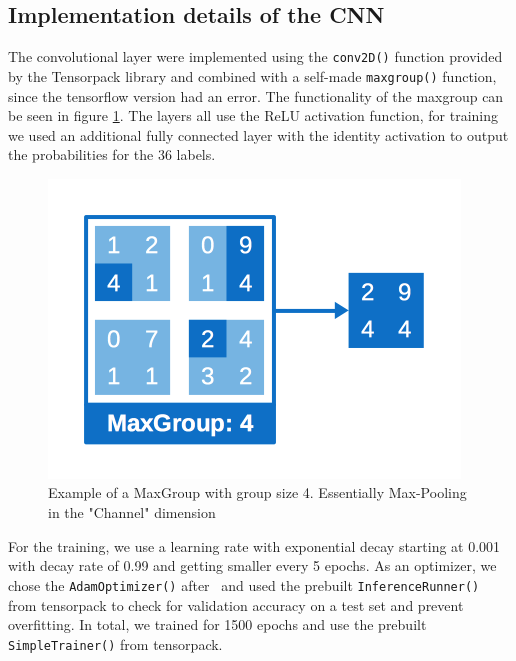 \documentclass{utue} %
\begin{document}
\subsection{Implementation details of the CNN}
The convolutional layer were implemented using the \texttt{conv2D()} function provided by the Tensorpack library and combined with a self-made \texttt{maxgroup()} function, since the tensorflow version had an error. The functionality of the maxgroup can be seen in figure \ref{fig:impl_maxgroup}. The layers all use the ReLU activation function, for training we used an additional fully connected layer with the identity activation to output the probabilities for the 36 labels. \\
\begin{figure}[h!]
	\centering
	\includegraphics[width=.9\columnwidth]{graphics/impl_maxgroups.png}
	\caption{\label{fig:impl_maxgroup} Example of a MaxGroup with group size 4. Essentially Max-Pooling in the "Channel" dimension}
\end{figure}

For the training, we use a learning rate with exponential decay starting at 0.001 with decay rate of 0.99 and getting smaller every 5 epochs. As an optimizer, we chose the \texttt{AdamOptimizer()} after~\cite{Adam} and used the prebuilt \texttt{InferenceRunner()} from tensorpack to check for validation accuracy on a test set and prevent overfitting. In total, we trained for 1500 epochs and use the prebuilt \texttt{SimpleTrainer()} from tensorpack. 
\end{document}
